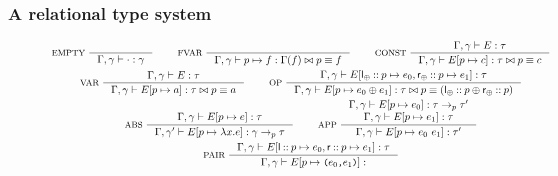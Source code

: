 \subsubsection{A relational type system}
\label{sec:rel-type-sys}

\begin{figure}
  \centering
  \begin{gather*}
    \inference[ EMPTY ]{ }{
      \Gamma, \gamma \judges \cdot : \gamma } \qquad
    \inference[ FVAR ]{ }{
      \Gamma, \gamma \judges p \mapsto f : %
      \Gamma(f) \joinctr p \equiv f} \qquad
    \inference[ CONST ]{ %
      \Gamma, \gamma \judges E : \tau }{ %
      \Gamma, \gamma \judges \upd{ E }{ p }{ c } : %
      \tau \joinctr p \equiv c } \\
    \inference[ VAR ]{ %
      \Gamma, \gamma \judges E : \tau }{ %
      \Gamma, \gamma \judges \upd{ E }{ p }{ a } : %
      \tau \joinctr p \equiv a } \qquad
    \inference[ OP ]{ %
      \Gamma, \gamma \judges %
      E[ \leftopchild \cons p \mapsto e_0, %
        \rightopchild \cons p \mapsto e_1 ] : \tau }{ %
      \Gamma, \gamma \judges \upd{ E }{ p }{ e_0 \oplus e_1 } : %
      \tau \joinctr %
      p \equiv (\leftopchild \cons p \oplus \rightopchild \cons p) } \\
    \inference[ ABS ]{ 
      \Gamma, \gamma \judges \upd{ E }{ p }{ e } : \tau }{ %
      \Gamma, \gamma' \judges \upd{ E }{ p }{ \lambda x. e } : %
      \gamma \to_p \tau } \qquad
    \inference[ APP ]{ %
      \Gamma, \gamma \judges \upd{E}{p}{e_0} : \tau \to_p \tau' \\
      \Gamma, \gamma \judges \upd{E}{p}{e_1} : \tau }{
      \Gamma, \gamma \judges \upd{ E }{ p }{e_0\ e_1} : \tau' } \\
    \inference[ PAIR ]{
      \Gamma, \gamma \judges %
      E[ \leftchild \cons p \mapsto e_0, %
      \rightchild \cons p \mapsto e_1 ] : \tau }{
      \Gamma, \gamma \judges \upd{E}{p}{ \pair{e_0}{e_1} } :
}
\end{gather*}
\end{figure}
